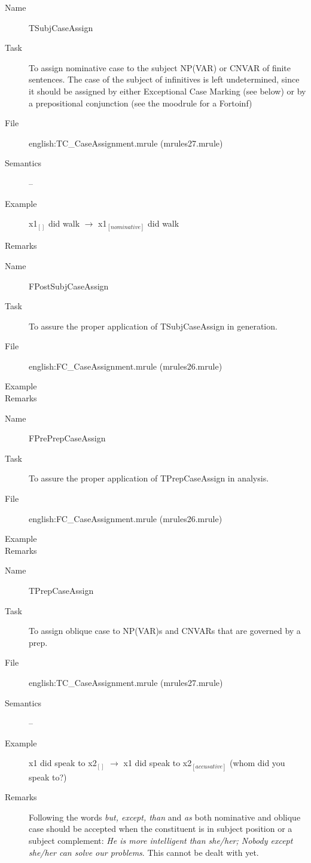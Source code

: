 \begin{description}
\vspace{1 cm}
\begin{description}
\item[Name] TSubjCaseAssign
\item[Task] To assign nominative case to the subject NP(VAR) or CNVAR of finite 
sentences. The case of the subject of infinitives is left undetermined, since 
it should be assigned by either Exceptional Case Marking (see below) or by a 
prepositional conjunction (see the moodrule for a Fortoinf)
\item[File] english:TC\_CaseAssignment.mrule (mrules27.mrule)
\item[Semantics] -- 
\item[Example] x1$_{[]}$ did walk $\rightarrow$ x1$_{[nominative]}$ did walk
\item[Remarks]
\end{description}

\vspace{1 cm}
\begin{description}
\item[Name] FPostSubjCaseAssign
\item[Task] To assure the proper application of TSubjCaseAssign in generation.
\item[File] english:FC\_CaseAssignment.mrule (mrules26.mrule)
\item[Example]
\item[Remarks]
\end{description}

\vspace{1 cm}
\begin{description}
\item[Name] FPrePrepCaseAssign
\item[Task] To assure the proper application of TPrepCaseAssign in analysis.
\item[File] english:FC\_CaseAssignment.mrule (mrules26.mrule)
\item[Example] 
\item[Remarks]
\end{description}

\vspace{1 cm}
\begin{description}
\item[Name] TPrepCaseAssign
\item[Task] To assign oblique case to NP(VAR)s and CNVARs that are governed by 
a prep.
\item[File] english:TC\_CaseAssignment.mrule (mrules27.mrule)
\item[Semantics] -- 
\item[Example] x1 did speak to x2$_{[]}$ $\rightarrow$ x1 did speak to 
x2$_{[accusative]}$ (whom did you speak to?)
\item[Remarks] Following the words {\em but, except, than\/} and {\em as\/} 
both nominative and oblique case should be accepted when the constituent is in 
subject position or a subject complement: {\em He is more 
intelligent than she/her; Nobody except she/her can solve our problems\/}. This 
cannot be dealt with yet.
\end{description}


\end{description}
